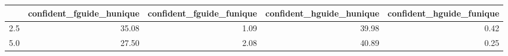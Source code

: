 \begin{tabular}{lrrrr}
\toprule
 & confident_fguide_hunique & confident_fguide_funique & confident_hguide_hunique & confident_hguide_funique \\
\midrule
2.5 & 35.08 & 1.09 & 39.98 & 0.42 \\
5.0 & 27.50 & 2.08 & 40.89 & 0.25 \\
\bottomrule
\end{tabular}
